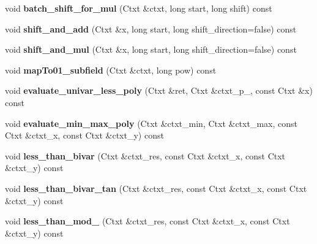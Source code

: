 \begin{DoxyCompactItemize}
void {\bfseries batch\+\_\+shift\+\_\+for\+\_\+mul} (Ctxt \&ctxt, long start, long shift) const
\item 
\mbox{\label{classhe__cmp_1_1Comparator_af0d7a0ab4feb280db3686d1d4077a385}} 
void {\bfseries shift\+\_\+and\+\_\+add} (Ctxt \&x, long start, long shift\+\_\+direction=false) const
\item 
\mbox{\label{classhe__cmp_1_1Comparator_aea67dad106c9e6c7254b86cb0a0fcc95}} 
void {\bfseries shift\+\_\+and\+\_\+mul} (Ctxt \&x, long start, long shift\+\_\+direction=false) const
\item 
\mbox{\label{classhe__cmp_1_1Comparator_a131102f90b7d7f3a6050ad1f721f60e1}} 
void {\bfseries map\+To01\+\_\+subfield} (Ctxt \&ctxt, long pow) const
\item 
\mbox{\label{classhe__cmp_1_1Comparator_a7916abd19a16ad763df4f64cb21be2ee}} 
void {\bfseries evaluate\+\_\+univar\+\_\+less\+\_\+poly} (Ctxt \&ret, Ctxt \&ctxt\+\_\+p\+\_, const Ctxt \&x) const
\item 
\mbox{\label{classhe__cmp_1_1Comparator_aaf5d2bdea01bafbe1bd8264be1ac3f06}} 
void {\bfseries evaluate\+\_\+min\+\_\+max\+\_\+poly} (Ctxt \&ctxt\+\_\+min, Ctxt \&ctxt\+\_\+max, const Ctxt \&ctxt\+\_\+x, const Ctxt \&ctxt\+\_\+y) const
\item 
\mbox{\label{classhe__cmp_1_1Comparator_a5219422f8ecc83d9225523bb57eba8d7}} 
void {\bfseries less\+\_\+than\+\_\+bivar} (Ctxt \&ctxt\+\_\+res, const Ctxt \&ctxt\+\_\+x, const Ctxt \&ctxt\+\_\+y) const
\item 
\mbox{\label{classhe__cmp_1_1Comparator_af79fffbade4d761a722f24e1d1d78910}} 
void {\bfseries less\+\_\+than\+\_\+bivar\+\_\+tan} (Ctxt \&ctxt\+\_\+res, const Ctxt \&ctxt\+\_\+x, const Ctxt \&ctxt\+\_\+y) const
\item 
\mbox{\label{classhe__cmp_1_1Comparator_a862c57b935aa1b9857b187f4e5ec2855}} 
void {\bfseries less\+\_\+than\+\_\+mod\+\_} (Ctxt \&ctxt\+\_\+res, const Ctxt \&ctxt\+\_\+x, const Ctxt \&ctxt\+\_\+y) const

\end{DoxyCompactItemize}
